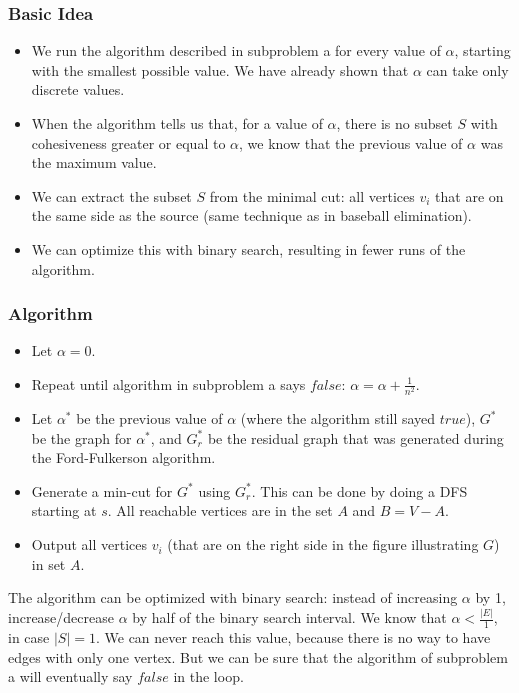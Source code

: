 \documentclass[12pt]{article}
\begin{document}
\subsubsection*{Basic Idea}
\begin{itemize}
	\item We run the algorithm described in subproblem a for every value of $\alpha$, starting with the smallest possible value. We have already shown that $\alpha$ can take only discrete values.
	\item When the algorithm tells us that, for a value of $\alpha$, there is no subset $S$ with cohesiveness greater or equal to $\alpha$, we know that the previous value of $\alpha$ was the maximum value.
	\item We can extract the subset $S$ from the minimal cut: all vertices $v_i$ that are on the same side as the source (same technique as in baseball elimination).
	\item We can optimize this with binary search, resulting in fewer runs of the algorithm.
\end{itemize}

\subsubsection*{Algorithm}
\begin{itemize}
	\item Let $\alpha = 0$.
	\item Repeat until algorithm in subproblem a says $\mathit{false}$: $\alpha = \alpha + \frac{1}{n^2}$.
	\item Let $\alpha^*$ be the previous value of $\alpha$ (where the algorithm still sayed $\mathit{true}$), $G^*$ be the graph for $\alpha^*$, and $G_r^*$ be the residual graph that was generated during the Ford-Fulkerson algorithm.
	\item Generate a min-cut for $G^*$ using $G_r^*$. This can be done by doing a DFS starting at $s$. All reachable vertices are in the set $A$ and $B=V-A$.
	\item Output all vertices $v_i$ (that are on the right side in the figure illustrating $G$) in set $A$.
\end{itemize}

The algorithm can be optimized with binary search: instead of increasing $\alpha$ by 1, increase/decrease $\alpha$ by half of the binary search interval. We know that $\alpha < \frac{|E|}{1}$, in case $|S| = 1$. We can never reach this value, because there is no way to have edges with only one vertex. But we can be sure that the algorithm of subproblem a will eventually say $\mathit{false}$ in the loop.
\end{document}

